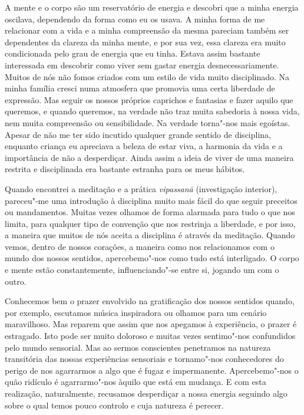 A mente e o corpo são um reservatório de energia e descobri que a minha
energia oscilava, dependendo da forma como eu os usava. A minha forma de
me relacionar com a vida e a minha compreensão da mesma pareciam também
ser dependentes da clareza da minha mente, e por sua vez, essa clareza
era muito condicionada pelo grau de energia que eu tinha. Estava assim
bastante interessada em descobrir como viver sem gastar energia
desnecessariamente. Muitos de nós não fomos criados com um estilo de
vida muito disciplinado. Na minha família cresci numa atmosfera que
promovia uma certa liberdade de expressão. Mas seguir os nossos próprios
caprichos e fantasias e fazer aquilo que queremos, e quando queremos, na
verdade não traz muita sabedoria à nossa vida, nem muita compreensão ou
sensibilidade. Na verdade torna"-nos mais egoístas. Apesar de não me ter
sido incutido qualquer grande sentido de disciplina, enquanto criança eu
apreciava a beleza de estar viva, a harmonia da vida e a importância de
não a desperdiçar. Ainda assim a ideia de viver de uma maneira restrita
e disciplinada era bastante estranha para os meus hábitos.

Quando encontrei a meditação e a prática \emph{vipassanā} (investigação
interior), pareceu"-me uma introdução à disciplina muito mais fácil do
que seguir preceitos ou mandamentos. Muitas vezes olhamos de forma
alarmada para tudo o que nos limita, para qualquer tipo de convenção que
nos restrinja a liberdade, e por isso, a maneira que muitos de nós
aceita a disciplina é através da meditação. Quando vemos, dentro de
nossos corações, a maneira como nos relacionamos com o mundo dos nossos
sentidos, apercebemo"-nos como tudo está interligado. O corpo e mente
estão constantemente, influenciando"-se entre si, jogando um com o outro.

Conhecemos bem o prazer envolvido na gratificação dos nossos sentidos
quando, por exemplo, escutamos música inspiradora ou olhamos para um
cenário maravilhoso. Mas reparem que assim que nos apegamos à
experiência, o prazer é estragado. Isto pode ser muito doloroso e muitas
vezes sentimo"-nos confundidos pelo mundo sensorial. Mas ao sermos
conscientes penetramos na natureza transitória das nossas experiências
sensoriais e tornamo"-nos conhecedores do perigo de nos agarrarmos a algo
que é fugaz e impermanente. Apercebemo"-nos o quão ridículo é
agarrarmo"-nos àquilo que está em mudança. E com esta realização,
naturalmente, recusamos desperdiçar a nossa energia seguindo algo sobre
o qual temos pouco controlo e cuja natureza é perecer.


